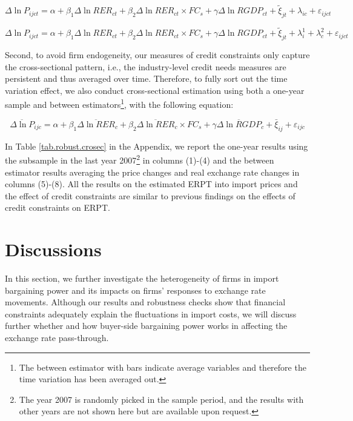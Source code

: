 \begin{equation}
    \Delta \ln P_{ijct}=\alpha+\beta_{1} \Delta \ln RER_{ct}+\beta_{2} \Delta \ln RER_{ct} \times FC_{s}+\gamma \Delta \ln RGDP_{ct}+\tilde{\xi}_{jt}+\lambda_{ic}+\varepsilon_{ijct}
	\label{eq.credit.fe1}
\end{equation}

\begin{equation}
    \Delta \ln P_{ijct}=\alpha+\beta_{1} \Delta \ln RER_{ct}+\beta_{2} \Delta \ln RER_{ct} \times FC_{s}+\gamma \Delta \ln RGDP_{ct}+\tilde{\xi}_{jt}+\lambda^1_{i} + \lambda^2_{c} +\varepsilon_{ijct}
	\label{eq.credit.fe2}
\end{equation}

Second, to avoid firm endogeneity, our measures of credit constraints only capture the cross-sectional pattern, i.e., the industry-level credit needs measures are persistent and thus averaged over time. Therefore, to fully sort out the time variation effect, we also conduct cross-sectional estimation using both a one-year sample and between estimators\footnote{The between estimator with bars indicate average variables and therefore the time variation has been averaged out.}, with the following equation:

\begin{equation}
	\overline{\Delta \ln P}_{ijc}=\alpha+\beta_{1} \overline{\Delta \ln RER}_{c}+\beta_{2} \overline{\Delta \ln RER}_{c} \times FC_{s}+\gamma \overline{\Delta \ln RGDP}_{c}+\bar{\xi}_{ij} +\varepsilon_{ijc}
	\label{eq.credit.crosec}
\end{equation}

In Table \ref{tab.robust.crosec} in the Appendix, we report the one-year results using the subsample in the last year 2007\footnote{The year 2007 is randomly picked in the sample period, and the results with other years are not shown here but are available upon request.} in columns (1)-(4) and the between estimator results averaging the price changes and real exchange rate changes in columns (5)-(8). All the results on the estimated ERPT into import prices and the effect of credit constraints are similar to previous findings on the effects of credit constraints on ERPT.

\section{Discussions} \label{Discussion}

In this section, we further investigate the heterogeneity of firms in import bargaining power and its impacts on firms’ responses to exchange rate movements. Although our results and robustness checks show that financial constraints adequately explain the fluctuations in import costs, we will discuss further whether and how buyer-side bargaining power works in affecting the exchange rate pass-through.

